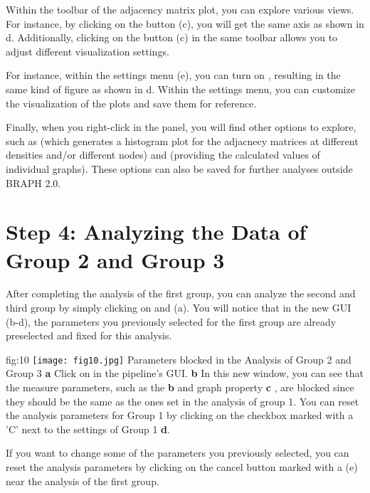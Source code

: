 \documentclass[justified]{tufte-handout}
\begin{document}
{Within the toolbar of the adjacency matrix plot, you can explore various views.
For instance, by clicking on the  button (c), you will get the same axis as shown in d. Additionally, clicking on the  button (c) in the same toolbar allows you to adjust different visualization settings.

For instance, within the settings menu (e), you can turn on , resulting in the same kind of figure as shown in d. Within the settings menu, you can customize the visualization of the plots and save them for reference.

Finally, when you right-click in the  panel, you will find other options to explore, such as  (which generates a histogram plot for the adjacnecy matrices at different densities and/or different nodes) and  (providing the calculated values of individual graphs). These options can also be saved for further analyses outside BRAPH 2.0.

\section{Step 4: Analyzing the Data of Group 2 and Group 3}

After completing the analysis of the first group, you can analyze the second and third group by simply clicking on  and  (a). You will notice that in the new GUI (b-d), the parameters you previously selected for the first group are already preselected and fixed for this analysis. 

	{fig:10}
	{
	\texttt{[image: fig10.jpg]}
	}
	{Parameters blocked in the Analysis of Group 2 and Group 3}
	{
	{\bf a} Click on  in the pipeline's GUI.
	{\bf b} In this new window, you can see that the measure parameters, such as the {\bf b}  and graph property {\bf c} , are blocked since they should be the same as the ones set in the analysis of group 1. You can reset the analysis parameters for Group 1 by clicking on the checkbox marked with a 'C' next to the settings of Group 1 {\bf d}.
	}
	
If you want to change some of the parameters you previously selected, you can reset the analysis parameters by clicking on the cancel button marked with a  (e) near the analysis of the first group.
 
}
\end{document}
